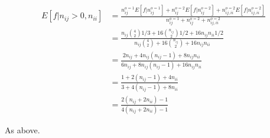 \documentclass[9pt,lineno]{elife}
\begin{document}
\begin{equation}
\begin{split}
E[f|n_{ij} > 0, n_{ii}] & = \frac{n^{o=1}_{ij}E[f|n^{o=1}_{ij}] + n^{o=2}_{ij}E[f|n^{o=2}_{ij}] 
+ n^{o=2}_{ij, ii}E[f|n^{o=2}_{ij, ii}]}{n^{o=1}_{ij} + n^{o=2}_{ij} + n^{o=2}_{ij, ii}} \\
& = \frac{ n_{ij}{4\choose 2}1/3 + 16{n_{ij}\choose 2}1/2 + 16n_{ij}n_{ii}1/2}{
n_{ij}{4\choose 2} + 16{n_{ij}\choose 2} + 16n_{ij}n_{ii}} \\
& = \frac{2n_{ij} + 4n_{ij}(n_{ij} - 1) + 8n_{ij}n_{ii}}{6n_{ij} + 8n_{ij}(n_{ij} - 1) + 16n_{ij}n_{ii}}\\
& = \frac{1 + 2(n_{ij} - 1) + 4n_{ii}}{3 + 4(n_{ij} - 1) + 8n_{ii}} \\
& = \frac{2(n_{ij} + 2n_{ii}) - 1}{4(n_{ij} + 2n_{ii}) - 1}
\end{split}
\end{equation}

As above.



\end{document}
